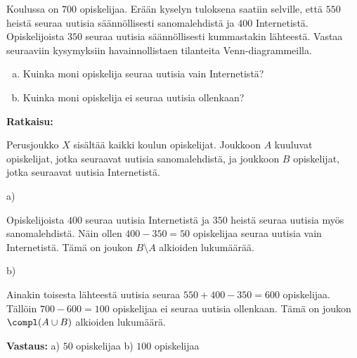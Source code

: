\begin{esimerkki}
Koulussa on $700$ opiskelijaa. Erään kyselyn tuloksena saatiin selville, että $550$ heistä 
seuraa uutisia säännöllisesti sanomalehdistä ja $400$ Internetistä. Opiskelijoista $350$  
seuraa uutisia säännöllisesti kummastakin lähteestä. Vastaa seuraaviin kysymyksiin
havainnollistaen tilanteita Venn-diagrammeilla.
\begin{enumerate}[a)]
\item Kuinka moni opiskelija seuraa uutisia vain Internetistä?
\item Kuinka moni opiskelija ei seuraa uutisia ollenkaan?
\end{enumerate}

{\bf Ratkaisu:}

Perusjoukko $X$ sisältää kaikki koulun opiskelijat. Joukkoon $A$ kuuluvat opiskelijat, jotka seuraavat uutisia sanomalehdistä, ja joukkoon $B$ opiskelijat, jotka seuraavat uutisia Internetistä.

a)

\begin{center}


\end{center}

Opiskelijoista $400$ seuraa uutisia Internetistä ja $350$ heistä seuraa uutisia myös sanomalehdistä. Näin ollen $400 - 350 = 50$ opiskelijaa seuraa uutisia vain Internetistä. Tämä on joukon $B \setminus A$ alkioiden lukumäärää.

b)

\begin{center}


\end{center}

Ainakin toisesta lähteestä uutisia seuraa $550 + 400 - 350 = 600$ opiskelijaa. Tällöin $700 - 600 = 100$ opiskelijaa ei seuraa uutisia ollenkaan. Tämä on joukon $\compl(A\cup B)$ alkioiden lukumäärä.

{\bf Vastaus:} a) $50$ opiskelijaa b) $100$ opiskelijaa
\end{esimerkki}


